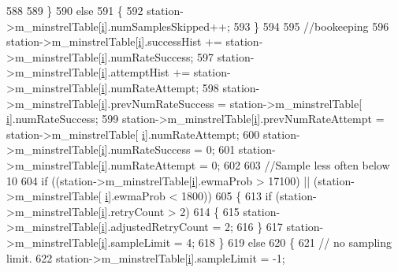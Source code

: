 \begin{DoxyCode}
588 
589         \}
590       \textcolor{keywordflow}{else}
591         \{
592           station->m\_minstrelTable[\hyperlink{bernuolliDistribution_8m_a6f6ccfcf58b31cb6412107d9d5281426}{i}].numSamplesSkipped++;
593         \}
594 
595       \textcolor{comment}{//bookeeping}
596       station->m\_minstrelTable[\hyperlink{bernuolliDistribution_8m_a6f6ccfcf58b31cb6412107d9d5281426}{i}].successHist += station->m\_minstrelTable[\hyperlink{bernuolliDistribution_8m_a6f6ccfcf58b31cb6412107d9d5281426}{i}].numRateSuccess;
597       station->m\_minstrelTable[\hyperlink{bernuolliDistribution_8m_a6f6ccfcf58b31cb6412107d9d5281426}{i}].attemptHist += station->m\_minstrelTable[\hyperlink{bernuolliDistribution_8m_a6f6ccfcf58b31cb6412107d9d5281426}{i}].numRateAttempt;
598       station->m\_minstrelTable[\hyperlink{bernuolliDistribution_8m_a6f6ccfcf58b31cb6412107d9d5281426}{i}].prevNumRateSuccess = station->m\_minstrelTable[
      \hyperlink{bernuolliDistribution_8m_a6f6ccfcf58b31cb6412107d9d5281426}{i}].numRateSuccess;
599       station->m\_minstrelTable[\hyperlink{bernuolliDistribution_8m_a6f6ccfcf58b31cb6412107d9d5281426}{i}].prevNumRateAttempt = station->m\_minstrelTable[
      \hyperlink{bernuolliDistribution_8m_a6f6ccfcf58b31cb6412107d9d5281426}{i}].numRateAttempt;
600       station->m\_minstrelTable[\hyperlink{bernuolliDistribution_8m_a6f6ccfcf58b31cb6412107d9d5281426}{i}].numRateSuccess = 0;
601       station->m\_minstrelTable[\hyperlink{bernuolliDistribution_8m_a6f6ccfcf58b31cb6412107d9d5281426}{i}].numRateAttempt = 0;
602 
603       \textcolor{comment}{//Sample less often below 10%
604       \textcolor{keywordflow}{if} ((station->m\_minstrelTable[\hyperlink{bernuolliDistribution_8m_a6f6ccfcf58b31cb6412107d9d5281426}{i}].ewmaProb > 17100) || (station->m\_minstrelTable[
      \hyperlink{bernuolliDistribution_8m_a6f6ccfcf58b31cb6412107d9d5281426}{i}].ewmaProb < 1800))
605         \{
613           \textcolor{keywordflow}{if} (station->m\_minstrelTable[\hyperlink{bernuolliDistribution_8m_a6f6ccfcf58b31cb6412107d9d5281426}{i}].retryCount > 2)
614             \{
615               station->m\_minstrelTable[\hyperlink{bernuolliDistribution_8m_a6f6ccfcf58b31cb6412107d9d5281426}{i}].adjustedRetryCount = 2;
616             \}
617           station->m\_minstrelTable[\hyperlink{bernuolliDistribution_8m_a6f6ccfcf58b31cb6412107d9d5281426}{i}].sampleLimit = 4;
618         \}
619       \textcolor{keywordflow}{else}
620         \{
621           \textcolor{comment}{// no sampling limit.}
622           station->m\_minstrelTable[\hyperlink{bernuolliDistribution_8m_a6f6ccfcf58b31cb6412107d9d5281426}{i}].sampleLimit = -1;
}
\end{DoxyCode}
